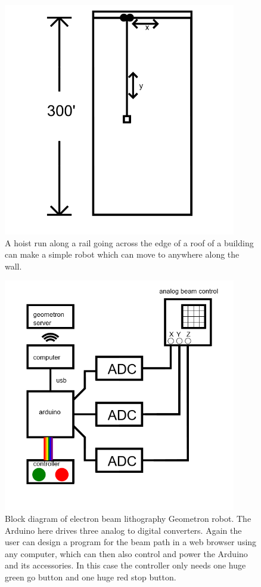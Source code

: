 \begin{figure}
	\centering
	\includegraphics[width=4in]{figures/machines/buildingwallrobot.png}
	\caption[buildingwallrobot]
	{A hoist run along a rail going across the edge of a roof of a building can make a simple robot which can move to anywhere along the wall.}
\end{figure}

\begin{figure}
	\centering
	\includegraphics[width=4in]{figures/machines/eblblockdiagram.png}
	\caption[eblblockdiagram]
	{Block diagram of electron beam lithography Geometron robot.  The Arduino here drives three analog to digital converters.  Again the user can design a program for the beam path in a web browser using any computer, which can then also control and power the Arduino and its accessories.  In this case the controller only needs one huge green go button and one huge red stop button.}
\end{figure}

